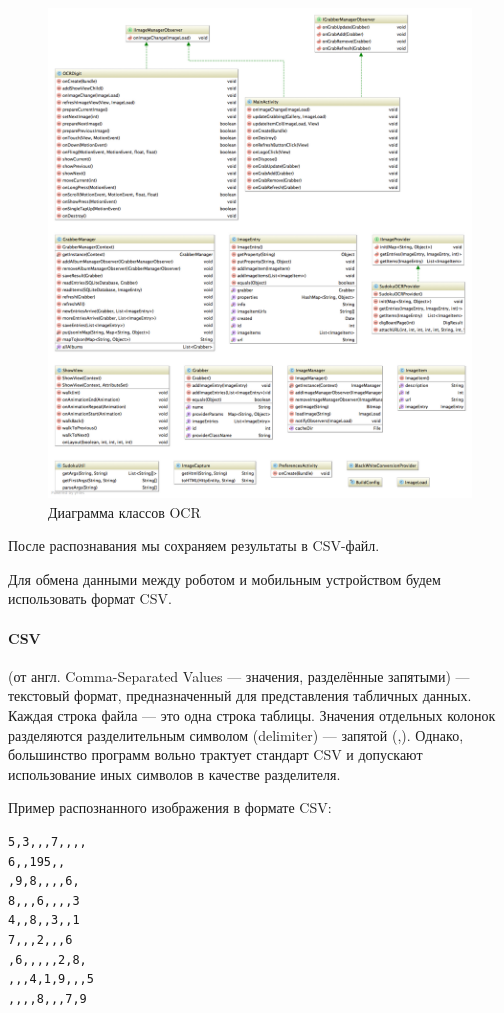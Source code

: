 \begin{figure}[ht]
  \centering
  \includegraphics[width=\textwidth]{inc/raster/design2-15.png}
  \caption{Диаграмма классов OCR}
  \label{fig:fig2100}
\end{figure}

После распознавания мы сохраняем результаты в CSV-файл.

Для обмена данными между роботом и мобильным устройством будем использовать формат CSV.

\paragraph{CSV} (от англ. Comma-Separated Values — значения, разделённые запятыми) — текстовый формат, предназначенный для представления табличных данных. Каждая строка файла — это одна строка таблицы. Значения отдельных колонок разделяются разделительным символом (delimiter) — запятой (,). Однако, большинство программ вольно трактует стандарт CSV и допускают использование иных символов в качестве разделителя. 

Пример распознанного изображения в формате CSV:
\begin{lstlisting}[caption=CSV файл с задание]
5,3,,,7,,,,
6,,195,,
,9,8,,,,6,
8,,,6,,,,3
4,,8,,3,,1
7,,,2,,,6
,6,,,,,2,8,
,,,4,1,9,,,5
,,,,8,,,7,9
\end{lstlisting}

